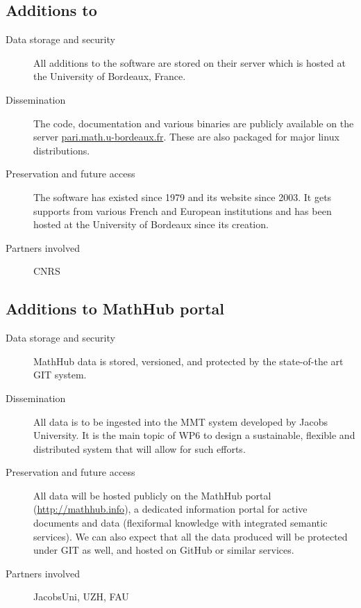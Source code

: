 \documentclass{deliverablereport}
\begin{document}
\subsection{Additions to \PariGP}

\begin{description}
\item[Data storage and security] All additions to the \PariGP software are stored on their server which is hosted at the University of Bordeaux, France.
\item[Dissemination] The \PariGP code, documentation and various binaries are publicly available on the server \href{http://pari.math.u-bordeaux.fr/}{pari.math.u-bordeaux.fr}. These are also packaged for major linux distributions.
\item[Preservation and future access] The \PariGP software has existed
  since 1979 and its website since 2003. It gets supports from various
  French and European institutions and has been hosted at the University of Bordeaux since its creation.
\item[Partners involved] CNRS
\end{description}


\subsection{Additions to MathHub portal}


\begin{description}
\item[Data storage and security] MathHub data is stored, versioned, and protected by the
state-of-the art GIT system.
\item[Dissemination] All data is to be ingested into the MMT system developed by Jacobs University. It is the main topic of WP6 to design a sustainable, flexible and distributed system that will allow for such efforts.
\item[Preservation and future access] All data will be hosted publicly on the MathHub portal (\url{http://mathhub.info}), a
dedicated information portal for active documents and data (flexiformal knowledge with
integrated semantic services). We can also expect that all the data produced will be protected under GIT as well, and hosted on GitHub or similar services. 
\item[Partners involved] JacobsUni, UZH, FAU
\end{description}
\end{document}
